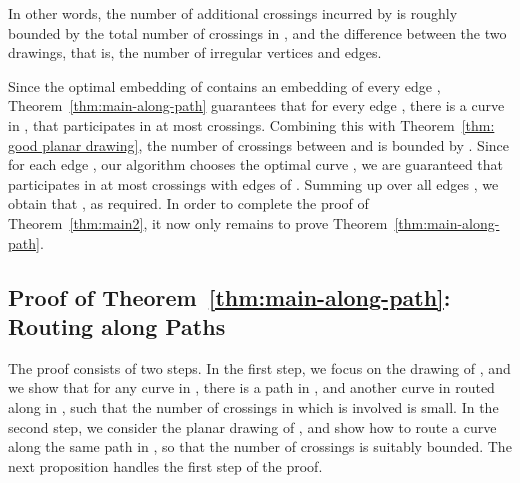 \documentclass[twoside,leqno,twocolumn]{article}
\begin{document}
In other words, the number of additional crossings incurred by  is roughly bounded by the total number of crossings in , and the difference between the two drawings, that is, the number of irregular vertices and edges.

Since the optimal embedding  of  contains an embedding of every edge , Theorem~\ref{thm:main-along-path} guarantees that for every edge , there is a curve  in , that participates in at most  crossings. Combining this with Theorem~\ref{thm: good planar drawing}, the number of crossings between  and  is bounded by . 
Since for each edge , our algorithm chooses the optimal curve , we are guaranteed that  participates in at most  crossings with edges of .
Summing up over all edges , we obtain that , as required. In order to complete the proof of Theorem~\ref{thm:main2}, it now only remains to prove Theorem~\ref{thm:main-along-path}.


\subsection{Proof of Theorem~\ref{thm:main-along-path}: Routing along Paths}\label{sec:routing along paths}
The proof consists of two steps. In the first step, we focus on the drawing  of , and we show that for any curve  in , there is a path  in , and another curve  in  routed along  in , such that the number of crossings in which  is involved is small. In the second step, we consider the planar drawing  of , and show how to route a curve  along the same path  in , so that the number of crossings is suitably bounded. The next proposition handles the first step of the proof.
\end{document}
